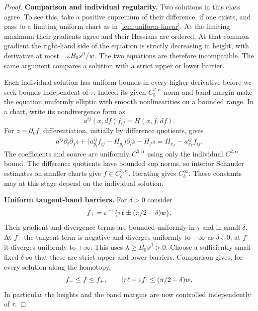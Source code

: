 \begin{proof}
\smallskip\noindent\textbf{Comparison and individual regularity.}
Two solutions in this class agree. To see this, take a positive supremum of their difference, if one exists, and pass to a limiting uniform chart as in \cref{lem:uniform-linear}. At the limiting maximum their gradients agree and their Hessians are ordered. At that common gradient the right-hand side of the equation is strictly decreasing in height, with derivative at most $-\varepsilon B_0s^\beta/w$. The two equations are therefore incompatible. The same argument compares a solution with a strict upper or lower barrier.

Each individual solution has uniform bounds in every higher derivative before we seek bounds independent of $\tau$. Indeed its given $C_b^{2,\alpha}$ norm and band margin make the equation uniformly elliptic with smooth nonlinearities on a bounded range. In a chart, write its nondivergence form as
\[
 a^{ij}(x,df)f_{ij}=H(x,f,df).
\]
For $z=\partial_k f$, differentiation, initially by difference quotients, gives
\begin{equation}\label{eq:individual-graph-bootstrap}
 \begin{split}
 a^{ij}\partial_i\partial_j z
  +\bigl(a^{ij}_{p_l}f_{ij}-H_{p_l}\bigr)\partial_lz-H_fz
   =H_{x_k}-a^{ij}_{x_k}f_{ij}.
 \end{split}
\end{equation}
The coefficients and source are uniformly $C^{0,\alpha}$ using only the individual $C^{2,\alpha}$ bound. The difference quotients have bounded sup norms, so interior Schauder estimates on smaller charts give $f\in C_b^{3,\alpha}$. Iterating gives $C_b^\infty$. These constants may at this stage depend on the individual solution.

\smallskip\noindent\textbf{Uniform tangent-band barriers.}
For $\delta>0$ consider
\[
 f_\pm=\varepsilon^{-1}\bigl(\tau\ell\pm(\pi/2-\delta)w\bigr).
\]
Their gradient and divergence terms are bounded uniformly in $\tau$ and in small $\delta$. At $f_+$ the tangent term is negative and diverges uniformly to $-\infty$ as $\delta\downarrow0$; at $f_-$ it diverges uniformly to $+\infty$. This uses $\lambda\ge B_0s^\beta>0$. Choose a sufficiently small fixed $\delta$ so that these are strict upper and lower barriers. Comparison gives, for every solution along the homotopy,
\begin{equation}\label{eq:uniform-graph-band}
 f_-\le f\le f_+,
 \qquad
 \lvert\tau\ell-\varepsilon f\rvert\le(\pi/2-\delta)w.
\end{equation}
In particular the heights and the band margins are now controlled independently of $\tau$.


\end{proof}
